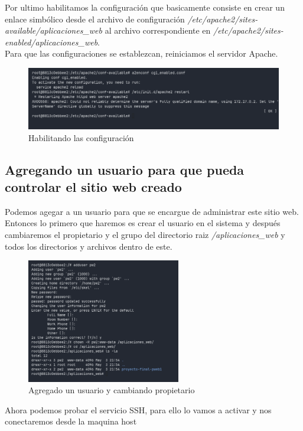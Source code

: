 Por ultimo habilitamos la configuración que basicamente consiste en crear un enlace simbólico desde el archivo de configuración \textit{/etc/apache2/sites-available/aplicaciones\_web} al archivo correspondiente en \textit{/etc/apache2/sites-enabled/aplicaciones\_web}.\\
Para que las configuraciones se establezcan, reiniciamos el servidor Apache.

\begin{figure}[H]
  \centering
  \includegraphics[width=1.0\textwidth]{img/restart2.png}
  \caption{Habilitando las configuración}
\end{figure}

\subsection{Agregando un usuario para que pueda controlar el sitio web creado}
Podemos agegar a un usuario para que se encargue de  administrar este sitio web. Entonces lo primero 
que haremos es crear el usuario en el sistema y después cambiaremos el propietario y el grupo del directorio 
raiz \textit{/aplicaciones\_web} y todos los directorios y archivos dentro de este.

\begin{figure}[H]
  \centering
  \includegraphics[width=0.6\textwidth]{img/adduser.png}
  \caption{Agregado un usuario y cambiando propietario}
\end{figure}

Ahora podemos probar el servicio SSH, para ello lo vamos a activar y nos conectaremos desde la maquina host

